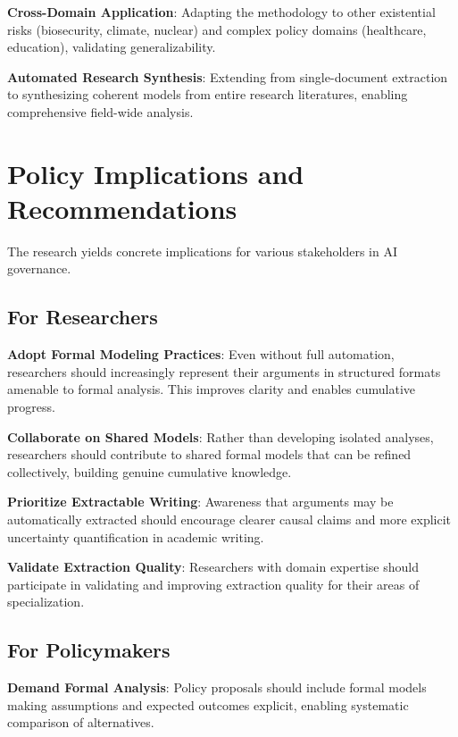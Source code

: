 \documentclass[
  11pt,
  letterpaper,
]{book}
\begin{document}
\textbf{Cross-Domain Application}: Adapting the methodology to other
existential risks (biosecurity, climate, nuclear) and complex policy
domains (healthcare, education), validating generalizability.

\textbf{Automated Research Synthesis}: Extending from single-document
extraction to synthesizing coherent models from entire research
literatures, enabling comprehensive field-wide analysis.

\section{Policy Implications and
Recommendations}\label{sec-policy-implications}

The research yields concrete implications for various stakeholders in AI
governance.

\subsection{For Researchers}\label{sec-researcher-recommendations}

\textbf{Adopt Formal Modeling Practices}: Even without full automation,
researchers should increasingly represent their arguments in structured
formats amenable to formal analysis. This improves clarity and enables
cumulative progress.

\textbf{Collaborate on Shared Models}: Rather than developing isolated
analyses, researchers should contribute to shared formal models that can
be refined collectively, building genuine cumulative knowledge.

\textbf{Prioritize Extractable Writing}: Awareness that arguments may be
automatically extracted should encourage clearer causal claims and more
explicit uncertainty quantification in academic writing.

\textbf{Validate Extraction Quality}: Researchers with domain expertise
should participate in validating and improving extraction quality for
their areas of specialization.

\subsection{For Policymakers}\label{sec-policymaker-recommendations}

\textbf{Demand Formal Analysis}: Policy proposals should include formal
models making assumptions and expected outcomes explicit, enabling
systematic comparison of alternatives.
\end{document}
